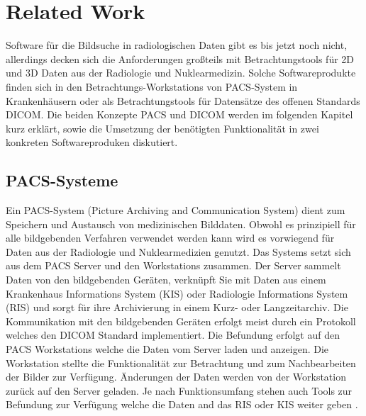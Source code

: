 
\section{Related Work}
\label{sec:relatedWork}
Software für die Bildsuche in radiologischen Daten gibt es bis jetzt noch nicht, 
allerdings decken sich die Anforderungen großteils mit Betrachtungstools für 2D und 3D Daten aus der Radiologie und Nuklearmedizin.
Solche Softwareprodukte finden sich in den Betrachtungs-Workstations von PACS-System in Krankenhäusern oder als Betrachtungstools für Datensätze des offenen Standards DICOM.
Die beiden Konzepte PACS und DICOM werden im folgenden Kapitel kurz erklärt, sowie die Umsetzung der benötigten Funktionalität in zwei konkreten Softwareproduken diskutiert.

\subsection{PACS-Systeme}
\label{sec:PACS-Systeme}
Ein PACS-System (Picture Archiving and Communication System) dient zum Speichern und Austausch von medizinischen Bilddaten.
Obwohl es prinzipiell für alle bildgebenden Verfahren verwendet werden kann wird es vorwiegend für Daten aus der Radiologie und Nuklearmedizien genutzt.
%
Das Systems setzt sich aus dem PACS Server und den Workstations zusammen.
Der Server sammelt Daten von den bildgebenden Geräten,
 verknüpft Sie mit Daten aus einem Krankenhaus Informations System (KIS) oder Radiologie Informations System (RIS) und sorgt für ihre Archivierung in einem Kurz- oder Langzeitarchiv. 
Die Kommunikation mit den bildgebenden Geräten erfolgt meist durch ein Protokoll welches den DICOM Standard implementiert.
%
Die Befundung erfolgt auf den PACS Workstations welche die Daten vom Server laden und anzeigen.
Die Workstation stellte die Funktionalität zur Betrachtung und zum Nachbearbeiten der Bilder zur Verfügung.
Änderungen der Daten werden von der Workstation zurück auf den Server geladen.
Je nach Funktionsumfang stehen auch Tools zur Befundung zur Verfügung welche die Daten and das RIS oder KIS weiter geben \cite{pacs}.

